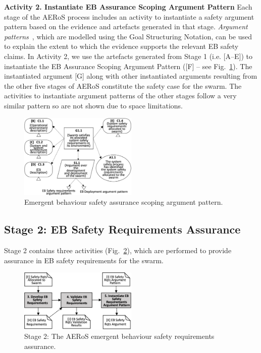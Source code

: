 \documentclass{article}
\begin{document}
\noindent\textbf{Activity 2. Instantiate EB Assurance Scoping Argument Pattern} Each stage of the AERoS process includes an activity to instantiate a safety argument pattern based on the evidence and artefacts generated in that stage. 
\emph{Argument patterns}~\cite{Hawkins2021}, which are modelled using the Goal Structuring Notation, can be used to explain the extent to which the evidence supports the relevant EB safety claims.  
In Activity 2, we use the artefacts generated from Stage 1 (i.e. [A–E]) to instantiate the EB Assurance Scoping Argument Pattern ([F] – see Fig.~\ref{stage1-ap}). 
The instantiated argument [G] along with other instantiated arguments resulting from the other five stages of AERoS constitute the safety case for the swarm. The activities to instantiate argument patterns of the other stages follow a very similar pattern so are not shown due to space limitations.
\begin{figure}[!h]
		\centering
		\includegraphics[width=0.5\textwidth]{AERoS-Stage1-Argumentpattern.pdf}
		\caption{Emergent behaviour safety assurance scoping argument pattern.}
		\label{stage1-ap}
\end{figure}
\subsection{Stage 2: EB Safety Requirements Assurance} \label{framework-stage2}
Stage 2 contains three activities (Fig.~\ref{aeros-stage2}), which are performed to provide assurance in EB safety requirements for the swarm. 
\begin{figure}[!h]
	\centering
	\centering
	\includegraphics[width=0.5\textwidth]{AERoS-Stage2.png}
	\caption{Stage 2: The AERoS emergent behaviour safety requirements assurance.}
	\label{aeros-stage2}
\end{figure}
\end{document}
